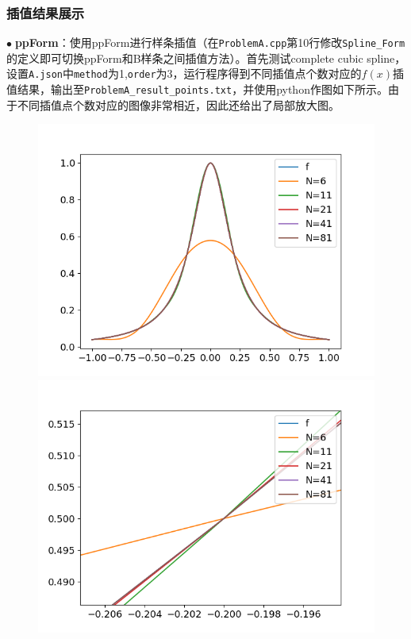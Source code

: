 \documentclass{ctexart}
\begin{document}
\begin{sloppypar}
\subsubsection{插值结果展示}
$\bullet \;$\textbf{ppForm}：使用ppForm进行样条插值（在\verb|ProblemA.cpp|第10行修改\verb|Spline_Form|的定义即可切换ppForm和B样条之间插值方法）。首先测试complete cubic spline，设置\verb|A.json|中\verb|method|为1,\verb|order|为3，运行程序得到不同插值点个数对应的$f(x)$插值结果，输出至\verb|ProblemA_result_points.txt|，并使用python作图如下所示。由于不同插值点个数对应的图像非常相近，因此还给出了局部放大图。
\begin{figure}[H]
  \begin{minipage}[t]{0.5\linewidth}
    \centering
    \includegraphics[scale = 0.42]{fig//ProblemA_ppForm_13.png}
  \end{minipage}
  \begin{minipage}[t]{0.5\linewidth}
    \centering
    \includegraphics[scale = 0.42]{fig//ProblemA_ppForm_13_scaled.png}

\end{minipage}
\end{figure}
\end{sloppypar}
\end{document}
